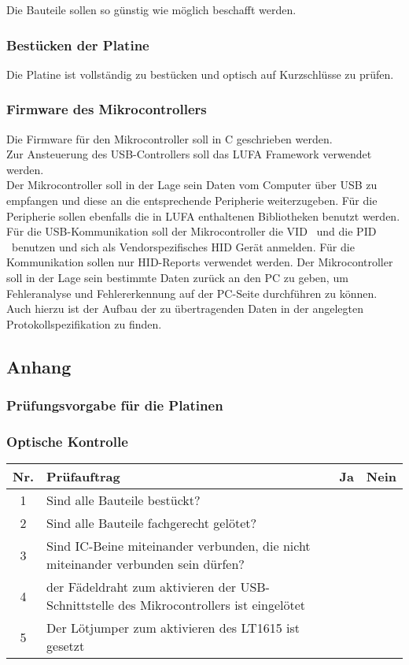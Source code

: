 Die Bauteile sollen so günstig wie möglich beschafft werden. 

\subsubsection{Bestücken der Platine}

Die Platine ist vollständig zu bestücken und optisch auf Kurzschlüsse zu prüfen.

\subsubsection{Firmware des Mikrocontrollers}

Die Firmware für den Mikrocontroller soll in C geschrieben werden.\\
Zur Ansteuerung des USB-Controllers soll das LUFA Framework verwendet werden.\\
Der Mikrocontroller soll in der Lage sein Daten vom Computer über USB zu empfangen und diese
an die entsprechende Peripherie weiterzugeben. Für die Peripherie sollen ebenfalls die in LUFA enthaltenen Bibliotheken
benutzt werden.\\
Für die USB-Kommunikation soll der Mikrocontroller die VID \VID\ und die PID \PID\ benutzen und sich als Vendorspezifisches HID Gerät anmelden. Für die Kommunikation sollen nur HID-Reports verwendet werden. Der Mikrocontroller soll in der Lage sein bestimmte Daten zurück an den PC zu geben, um Fehleranalyse und Fehlererkennung auf der PC-Seite durchführen zu können.
Auch hierzu ist der Aufbau der zu übertragenden Daten in der angelegten Protokollspezifikation zu finden.
\pagebreak
\subsection{Anhang}
\subsubsection{Prüfungsvorgabe für die Platinen}
\subsubsection*{Optische Kontrolle}

\begin{flushleft}
	\begin{tabular}{|c||p{10cm}|c|c|}
		\hline
		Nr. & Prüfauftrag & Ja & Nein \\
		\hline
		1 & Sind alle Bauteile bestückt? & & \\
		\hline
		2 & Sind alle Bauteile fachgerecht gelötet? & & \\
		\hline
		3 & Sind IC-Beine miteinander verbunden, die nicht miteinander verbunden sein dürfen? & & \\
		\hline
		4 & der Fädeldraht zum aktivieren der USB-Schnittstelle des Mikrocontrollers ist eingelötet & & \\
		\hline
		5 & Der Lötjumper zum aktivieren des LT1615 ist gesetzt & & \\
		\hline
	\end{tabular}
\end{flushleft}


